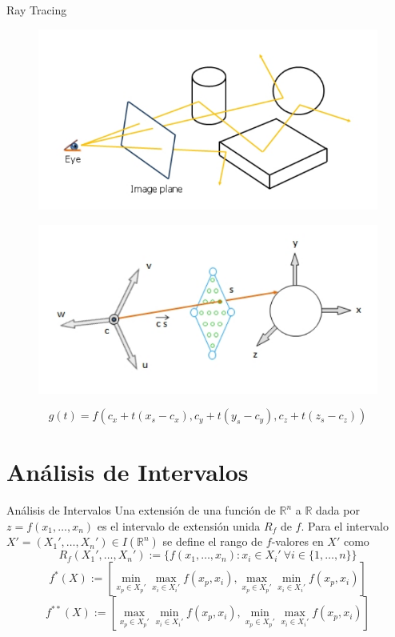 \documentclass{beamer}
\begin{document}
\begin{frame}{Ray Tracing}
	\begin{figure}[h]
	\centering
	\includegraphics[scale=0.25]{images/florez1.png}
	\end{figure}
\pause
	\begin{figure}[h]
	\centering
	\includegraphics[scale=0.25]{images/florez2.png}
	\end{figure}
\pause
\small
$$g(t) = f(c_x + t(x_s - c_x),c_y + t(y_s - c_y),c_z + t(z_s - c_z))$$
\end{frame}

\section{Análisis de Intervalos}
\begin{frame}{Análisis de Intervalos}
	Una extensión de una función de $\mathbb{R}^n$ a $\mathbb{R}$ dada por $z = f(x_1, \dotso, x_n)$ es el intervalo de extensión unida $R_f$ de $f$. Para el intervalo $X' = (X_1',\dotso, X_n') \in I(\mathbb{R}^n)$ se define el rango de $f$-valores en $X'$ como
	\begin{equation}
	R_f(X_1',\dotso, X_n') := \{ f(x_1, \dotso, x_n) : x_i \in X_i' \ \forall i \in \{1, \dotso, n \} \}
	\nonumber
	\end{equation}
\pause
	\begin{equation}
	f^*(X) := \left[ \min_{x_p \in X_p'} \max_{x_i \in X_i'} f(x_p,x_i), \max_{x_p \in X_p'} \min_{x_i \in X_i'} f(x_p,x_i) \right]
	\nonumber
	\end{equation}
	\begin{equation}
	f^{**}(X) := \left[ \max_{x_p \in X_p'} \min_{x_i \in X_i'} f(x_p,x_i), \min_{x_p \in X_p'} \max_{x_i \in X_i'} f(x_p,x_i) \right]
	\nonumber
	\end{equation}
\end{frame}
\end{document}
